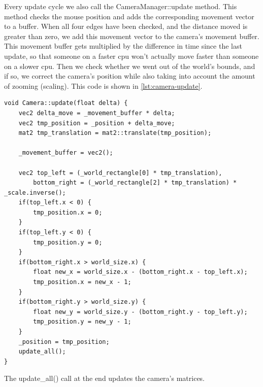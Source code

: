 Every update cycle we also call the CameraManager::update method. This method 
checks the mouse position and adds the corresponding movement vector to a 
buffer. When all four edges have been checked, and the distance moved is 
greater than zero, we add this movement vector to the camera's movement 
buffer. This movement buffer gets multiplied by the difference in time since 
the last update, so that someone on a faster cpu won't actually move faster 
than someone on a slower cpu. Then we check whether we went out of the world's 
bounds, and if so, we correct the camera's position while also taking into 
account the amount of zooming (scaling). This code is shown in 
\cref{lst:camera-update}.

\begin{lstlisting}[caption={Camera update method.},label={lst:camera-update}]
void Camera::update(float delta) {
    vec2 delta_move = _movement_buffer * delta;
    vec2 tmp_position = _position + delta_move;
    mat2 tmp_translation = mat2::translate(tmp_position);

    _movement_buffer = vec2();

    vec2 top_left = (_world_rectangle[0] * tmp_translation),
        bottom_right = (_world_rectangle[2] * tmp_translation) * _scale.inverse();
    if(top_left.x < 0) {
        tmp_position.x = 0;
    }
    if(top_left.y < 0) {
        tmp_position.y = 0;
    }
    if(bottom_right.x > world_size.x) {
        float new_x = world_size.x - (bottom_right.x - top_left.x);
        tmp_position.x = new_x - 1;
    }
    if(bottom_right.y > world_size.y) {
        float new_y = world_size.y - (bottom_right.y - top_left.y);
        tmp_position.y = new_y - 1;
    }
    _position = tmp_position;
    update_all();
}
\end{lstlisting}

The update\_all() call at the end updates the camera's matrices.

